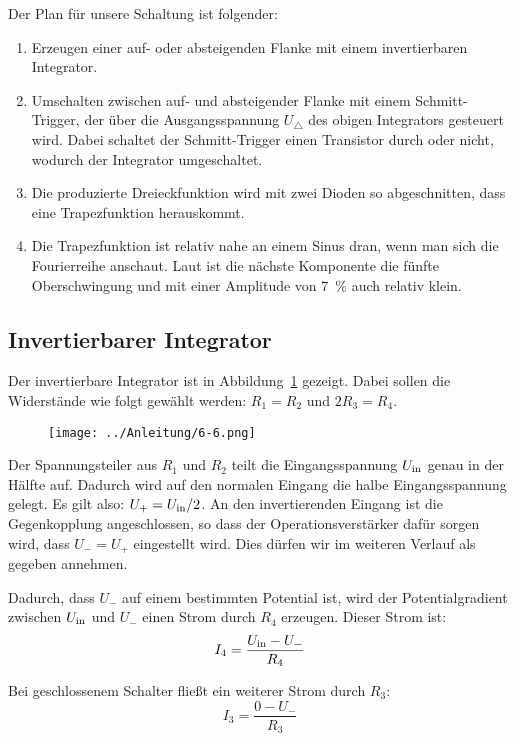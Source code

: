 Der Plan für unsere Schaltung ist folgender:
\begin{enumerate}
	\item
		Erzeugen einer auf- oder absteigenden Flanke mit einem invertierbaren
		Integrator.
	\item
		Umschalten zwischen auf- und absteigender Flanke mit einem
		Schmitt-Trigger, der über die Ausgangsspannung $U_\triangle$ des obigen
		Integrators gesteuert wird. Dabei schaltet der Schmitt-Trigger einen
		Transistor durch oder nicht, wodurch der Integrator umgeschaltet.
	\item
		Die produzierte Dreieckfunktion wird mit zwei Dioden so abgeschnitten,
		dass eine Trapezfunktion herauskommt.
	\item
		Die Trapezfunktion ist relativ nahe an einem Sinus dran, wenn man sich
		die Fourierreihe anschaut. Laut \cite[§6.1.3]{physik313-Anleitung} ist
		die nächste Komponente die fünfte Oberschwingung und mit einer
		Amplitude von \SI{7}{\percent} auch relativ klein.
\end{enumerate}

\FloatBarrier
\subsection{Invertierbarer Integrator}

Der invertierbare Integrator ist in Abbildung~\ref{fig:6-6} gezeigt. Dabei
sollen die Widerstände wie folgt gewählt werden: $R_1 = R_2$ und $2 R_3 = R_4$.

\begin{figure}[htbp]
	\centering
	\texttt{[image: ../Anleitung/6-6.png]}
	\caption{%
		\cite[Abbildung~6.6]{physik313-Anleitung}
	}
	\label{fig:6-6}
\end{figure}

Der Spannungsteiler aus $R_1$ und $R_2$ teilt die Eingangsspannung $U_\text{in}$ genau
in der Hälfte auf. Dadurch wird auf den normalen Eingang die halbe
Eingangsspannung gelegt. Es gilt also: $U_+ = U_\text{in}/2$. An den invertierenden
Eingang ist die Gegenkopplung angeschlossen, so dass der Operationsverstärker
dafür sorgen wird, dass $U_- = U_+$ eingestellt wird. Dies dürfen wir im
weiteren Verlauf als gegeben annehmen.

Dadurch, dass $U_-$ auf einem bestimmten Potential ist, wird der
Potentialgradient zwischen $U_\text{in}$ und $U_-$ einen Strom durch $R_4$ erzeugen.
Dieser Strom ist:
\[
	I_4 = \frac{U_\text{in} - U_-}{R_4}
\]

Bei geschlossenem Schalter fließt ein weiterer Strom durch $R_3$:
\[
	I_3 = \frac{0 - U_-}{R_3}
\]

